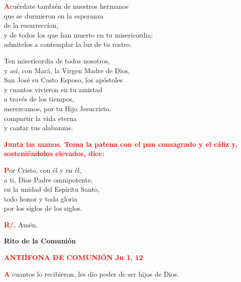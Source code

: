 \documentclass[12pt, letterpaper]{report}
\begin{document}
\lettrine[lines=1]{\bfseries \textcolor{red}{A}}{}\Large cu\'erdate tambi\'en de nuestros hermanos\\
que se durmieron en la esperanza\\
de la resurrecc\'ion,\\
y de todos los que han muerto en tu misericordia;\\
admitelos a contemplar la luz de tu rostro.\newline

Ten misericordia de todos nosotros,\\
y as\'i, con Mar\'a, la Virgen Madre de Dios,\\
San Jos\'e su Casto Esposo, los ap\'ostoles\\
y cuantos vivieron en tu amistad\\
a trav\'es de los tiempos,\\
merezcamos, por tu Hijo Jesucristo,\\
compartir la vida eterna\\
y cantar tus alabanzas. \newline

\large{\bfseries \textcolor{red}{Junta las manos. Toma la patena con el pan consagrado y el c\'aliz y, sosteni\'endolos elevados, dice:}}

\lettrine[lines=1]{\bfseries \textcolor{red}{P}}{}\Large or Cristo, con \'el y en \'el,\\
a ti, Dios Padre omnipotente,\\
en la unidad del Esp\'iritu Santo,\\
todo honor y toda gloria\\
por los siglos de los siglos.\newline

\Large \hspace{-0.9cm} {\bfseries \textcolor{red}{R/.}} \hspace{0.5cm} Am\'en.

\newpage

\begin{center}
\Huge {\bfseries Rito de la Comuni\'on}
\end{center}

\Large {\bfseries \textcolor{red}{ANTI\'IFONA DE COMUNI\'ON \hspace{2cm} Jn 1, 12}}

\lettrine[lines=1]{\bfseries \textcolor{red}{A}}{} \Large cuantos lo recibieron, les dio poder de ser hijos de Dios.\newline
\end{document}
